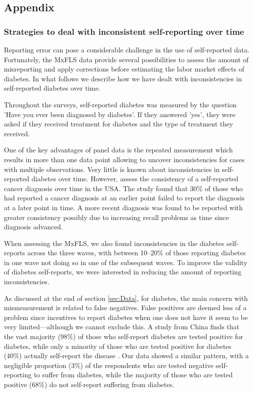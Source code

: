 \documentclass[12pt,english]{article}
\begin{document}
\clearpage
\begin{appendix}



\part*{\label{part:Appendix}Appendix}

\section{\label{sec:Appendix}Strategies to deal with inconsistent self-reporting over time}

Reporting error can pose a considerable challenge in the use of self-reported data. Fortunately, the \ac{MxFLS} data provide several possibilities to assess the amount of misreporting and apply corrections before estimating the labor market effects of diabetes. In what follows we describe how we have dealt with inconsistencies in self-reported diabetes over time.

Throughout the surveys, self-reported diabetes was measured by the question 'Have you ever been diagnosed by diabetes'. If they answered 'yes', they were asked if they received treatment for diabetes and the type of treatment they received.

One of the key advantages of panel data is the repeated measurement which results in more than one data point allowing to uncover inconsistencies for cases with multiple observations. Very little is known about inconsistencies in self-reported diabetes over time. However, \textcite{Zajacova2010} assess the consistency of a self-reported cancer diagnosis over time in the USA. The study found that 30\% of those who had reported a cancer diagnosis at an earlier point failed to report the diagnosis at a later point in time. A more recent diagnosis was found to be reported with greater consistency possibly due to increasing recall problems as time since diagnosis advanced.

When assessing the \ac{MxFLS}, we also found inconsistencies in the diabetes self-reports across the three waves, with between 10--20\% of those reporting diabetes in one wave not doing so in one of the subsequent waves. To improve the validity of diabetes self-reports, we were interested in reducing the amount of reporting inconsistencies.

As discussed at the end of section \ref{sec:Data}, for diabetes, the main concern with mismeasurement is related to false negatives. False positives are deemed less of a problem since incentives to report diabetes when one does not have it seem to be very limited---although we cannot exclude this.  A study from China finds that the vast majority (98\%) of those who self-report diabetes are tested positive for diabetes, while only a minority  of those who are tested positive for diabetes (40\%) actually self-report the disease \parencite{Yuan2015}.  Our data showed a similar pattern, with a negligible proportion (3\%) of the respondents who are tested negative self-reporting to suffer from diabetes, while the majority of those who are tested positive (68\%) do not self-report suffering from diabetes.


\end{appendix}
\end{document}
